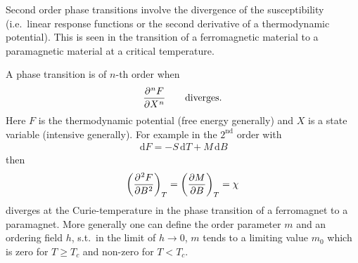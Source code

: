 \documentclass[a4paper,10pt]{article}
\newcommand{\td}{\,\text{d}}
\numberwithin{equation}{section}
\begin{document}
\begin{multicols}{2}
Second order phase transitions involve the divergence of the susceptibility (i.e.\ linear response functions or the second derivative of a thermodynamic potential).
This is seen in the transition of a ferromagnetic material to a paramagnetic material at a critical temperature.

A phase transition is of $n$-th order when 
\begin{align} 
  \diffp[n]{F}{X}\qquad \text{diverges}
.\end{align} 
Here $F$ is the thermodynamic potential (free energy generally) and $X$ is a state variable (intensive generally).
For example in the $2^\text{nd}$ order with 
\begin{align} 
  \td F=-S\td T+M\td B
\end{align} 
then
\begin{align} 
  \left(\diffp[2]{F}{B}\right)_T=\left(\diffp[]{M}{B}\right)_T=\chi 
\end{align} 
diverges at the Curie-temperature in the phase transition of a ferromagnet to a paramagnet.
More generally one can define the order parameter $m$ and an ordering field $h$, s.t.\ in the limit of $h\rightarrow 0$, $m$ tends to a limiting value $m_0$ which is zero for $T\geq T_c$ and non-zero for $T<T_c$.


\end{multicols}
\end{document}
